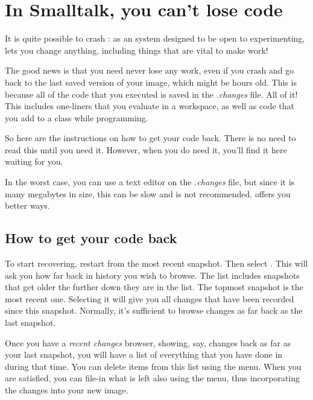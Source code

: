 \documentclass[a4paper,10pt,twoside]{book}
\begin{document}
\section{In Smalltalk, you can't lose code}
\label{sec:cantLoseCode} %

It is quite possible to crash \sq: as an system designed to be open to experimenting, \sq lets you change anything, including things that are vital to make \sq work!


The good news is that you need never lose any work, even if you crash and go back to the last saved version of your image, which might be hours old.
This is because all of the code that you executed is saved in the \emph{.changes} file.
All of it!
This includes one-liners that you evaluate in a workspace, as well as code that you add to a class while programming.

So here are the instructions on how to get your code back.
There is no need to read this until you need it.
However, when you do need it, you'll find it here waiting for you.

In the worst case, you can use a text editor on the \emph{.changes} file, but since it is many megabytes in size, this can be slow and is not recommended.
\sq offers you better ways.

\subsection{How to get your code back}
To start recovering, restart \sq from the most recent snapshot. Then select . This will ask you how far back in history you wish to browse. The list includes snapshots that get older the further down they are in the list. The topmost snapshot is the most recent one. Selecting it will give you all changes that have been recorded since this snapshot.
Normally, it's sufficient to browse changes as far back as the last snapshot.

Once you have a \emph{recent changes} browser, showing, say, changes back as far as your last snapshot, you will have a list of everything that you have done in \sq during that time.
You can delete items from this list using the  menu.
When you are satisfied, you can file-in what is left also using the  menu, thus incorporating the changes into your new image.
\end{document}
